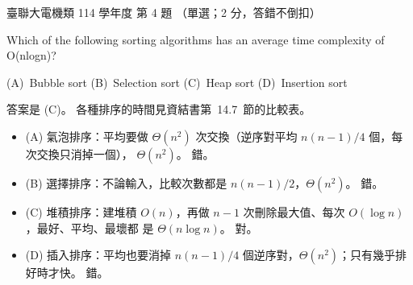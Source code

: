 \begin{pastexam}[label={px:ust-114-ee-ds-04}]{臺聯大電機類 114 學年度 第 4 題}
（單選；2 分，答錯不倒扣）

Which of the following sorting algorithms has an average time complexity of O(nlogn)?

(A)~Bubble sort \qquad (B)~Selection sort \qquad (C)~Heap sort \qquad (D)~Insertion sort
\end{pastexam}

\begin{pastsoln}
答案是 (C)。 各種排序的時間見資結書第~14.7~節的比較表。
\begin{itemize}
\item (A) 氣泡排序：平均要做 $\Theta(n^2)$ 次交換（逆序對平均 $n(n-1)/4$ 個，每次交換只消掉一個），
$\Theta(n^2)$。 錯。
\item (B) 選擇排序：不論輸入，比較次數都是 $n(n-1)/2$，$\Theta(n^2)$。 錯。
\item (C) 堆積排序：建堆積 $O(n)$，再做 $n - 1$ 次刪除最大值、每次 $O(\log n)$，最好、平均、最壞都
是 $\Theta(n \log n)$。 對。
\item (D) 插入排序：平均也要消掉 $n(n-1)/4$ 個逆序對，$\Theta(n^2)$；只有幾乎排好時才快。 錯。
\end{itemize}
\end{pastsoln}

